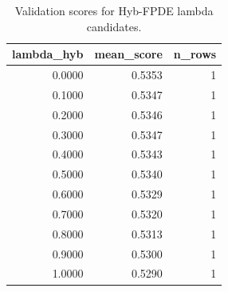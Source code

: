 \begin{table}[t]
\caption{Validation scores for Hyb-FPDE lambda candidates.}
\label{tab:lambda_distribution_computed}
\centering
\begin{tabular}{rrr}
\toprule
lambda\_hyb & mean\_score & n\_rows \\
\midrule
0.0000 & 0.5353 & 1 \\
0.1000 & 0.5347 & 1 \\
0.2000 & 0.5346 & 1 \\
0.3000 & 0.5347 & 1 \\
0.4000 & 0.5343 & 1 \\
0.5000 & 0.5340 & 1 \\
0.6000 & 0.5329 & 1 \\
0.7000 & 0.5320 & 1 \\
0.8000 & 0.5313 & 1 \\
0.9000 & 0.5300 & 1 \\
1.0000 & 0.5290 & 1 \\
\bottomrule
\end{tabular}

\end{table}
